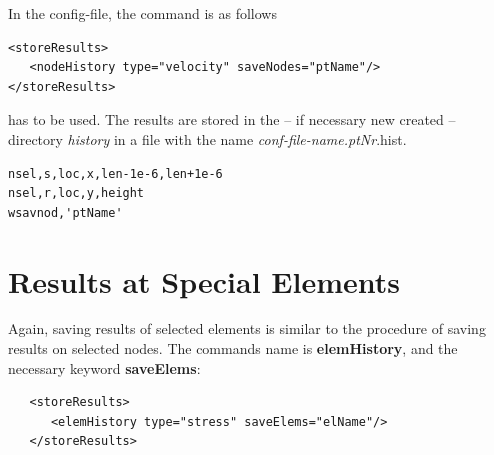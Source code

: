 In the config-file, the command is as follows

\begin{verbatim}
<storeResults>
   <nodeHistory type="velocity" saveNodes="ptName"/>
</storeResults>
\end{verbatim}

has to be used. The results are stored in the -- if necessary new
created -- directory {\em history} in a file with the name {\em
  conf-file-name.ptNr}.hist.

\begin{verbatim}
nsel,s,loc,x,len-1e-6,len+1e-6
nsel,r,loc,y,height
wsavnod,'ptName'
\end{verbatim}


\section{Results at Special Elements} 
Again, saving results of selected elements is similar to the procedure
of saving results on selected nodes. The commands name is {\bf
  elemHistory}, and the necessary keyword {\bf saveElems}:
\begin{verbatim}
   <storeResults>
      <elemHistory type="stress" saveElems="elName"/>
   </storeResults>
\end{verbatim}

